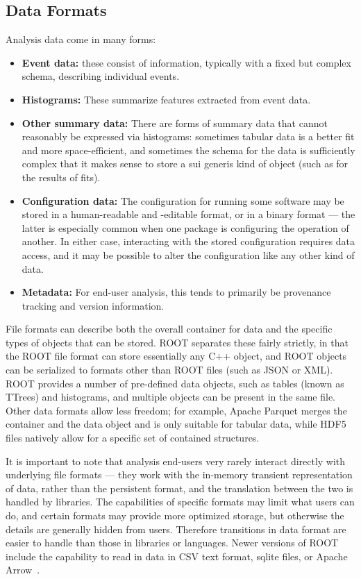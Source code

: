 \subsection{Data Formats}
Analysis data come in many forms:
\begin{itemize}
\item \textbf{Event data:} these consist of information, typically with a fixed but complex schema, describing individual events.
\item \textbf{Histograms:} These summarize features extracted from event data.
\item \textbf{Other summary data:} There are forms of summary data that cannot reasonably be expressed via histograms: sometimes tabular data is a better fit and more space-efficient, and sometimes the schema for the data is sufficiently complex that it makes sense to store a sui generis kind of object (such as for the results of fits).
\item \textbf{Configuration data:} The configuration for running some software may be stored in a human-readable and -editable format, or in a binary format --- the latter is especially common when one package is configuring the operation of another. In either case, interacting with the stored configuration requires data access, and it may be possible to alter the configuration like any other kind of data. 
\item \textbf{Metadata:} For end-user analysis, this tends to primarily be provenance tracking and version information.
\end{itemize}

File formats can describe both the overall container for data and the specific types of objects that can be stored. ROOT separates these fairly strictly, in that the ROOT file format can store essentially any C++ object, and ROOT objects can be serialized to formats other than ROOT files (such as JSON or XML). ROOT provides a number of pre-defined data objects, such as tables (known as TTrees) and histograms, and multiple objects can be present in the same file. Other data formats allow less freedom; for example, Apache Parquet \cite{Parquet} merges the container and the data object and is only suitable for tabular data, while HDF5 \cite{HDF5} files natively allow for a specific set of contained structures.

It is important to note that analysis end-users very rarely interact directly with underlying file formats --- they work with the in-memory transient representation of data, rather than the persistent format, and the translation between the two is handled by libraries. The capabilities of specific formats may limit what users can do, and certain formats may provide more optimized storage, but otherwise the details are generally hidden from users. Therefore transitions in data format are easier to handle than those in libraries or languages. Newer versions of ROOT include the capability to read in data in CSV text format, sqlite files, or Apache Arrow~\cite{Arrow}.

